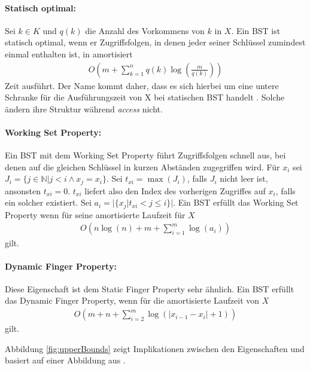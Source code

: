 \documentclass[a4paper,12pt]{article}
\begin{document}
\paragraph{Statisch optimal:}
Sei $k \in K$ und $q(k)$ die Anzahl des Vorkommens von $k$ in  $X$. Ein BST ist statisch optimal, wenn er Zugriffsfolgen, in denen jeder seiner Schlüssel zumindest einmal enthalten ist, in amortisiert 
\begin{align*}
O\left(m +\sum_{k = 1}^{n}q(k)\log \left( \frac{m}{q(k)} \right)\right) 
\end{align*}
Zeit ausführt. Der Name kommt daher, dass es sich hierbei um eine untere Schranke für die Ausführungszeit von X bei statischen BST handelt \cite{staticOptimal}. Solche ändern ihre Struktur während \textit{access} nicht.

\paragraph{Working Set Property:}
Ein BST mit dem Working Set Property führt Zugriffsfolgen schnell aus, bei denen auf die gleichen Schlüssel in kurzen Abständen zugegriffen wird.
Für $x_i$ sei $J_i = \{j \in \mathbb{N} \vert j < i \land x_j = x_i \}$.
Sei $t_{xi} = \max \left(J_i\right)$, falls $J_i$ nicht leer ist, ansonsten $t_{xi} = 0$. $t_{xi}$ liefert also den Index des vorherigen Zugriffes auf $x_i$, falls ein solcher existiert. Sei ${a_i = \vert\{x_j \vert t_{xi} < j \leq i   \} \vert }$.
Ein BST erfüllt das Working Set Property wenn für seine amortisierte Laufzeit für $X$
\begin{align*}
O\left(n \log\left( n\right) + m +\sum_{i = 1}^{m} \log \left(a_i\right) \right)
\end{align*} 
gilt. 


\paragraph{Dynamic Finger Property:}
Diese Eigenschaft ist dem Static Finger Property sehr ähnlich.
Ein BST erfüllt das Dynamic Finger Property, wenn für die amortisierte Laufzeit von $X$
\begin{align*}
O\left( m + n + \sum_{i = 2}^{m} \log \left(\vert x_{i-1} - x_i  \vert	+ 1	\right)\right)
\end{align*} 
gilt. 

\noindent Abbildung \ref{fig:upperBounds} zeigt Implikationen zwischen den Eigenschaften und basiert auf einer Abbildung aus \cite{upperBounds}.
\end{document}
